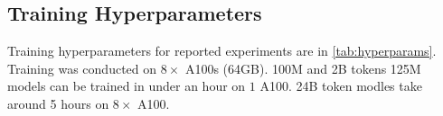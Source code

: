 \documentclass[11pt]{article}
\begin{document}

\subsection{Training Hyperparameters}

Training hyperparameters for reported experiments are in \autoref{tab:hyperparams}. Training was conducted on $8\times$ A100s (64GB). 100M and 2B tokens 125M models can be trained in under an hour on $1$ A100. 24B token modles take around 5 hours on $8 \times$ A100.  
\end{document}
